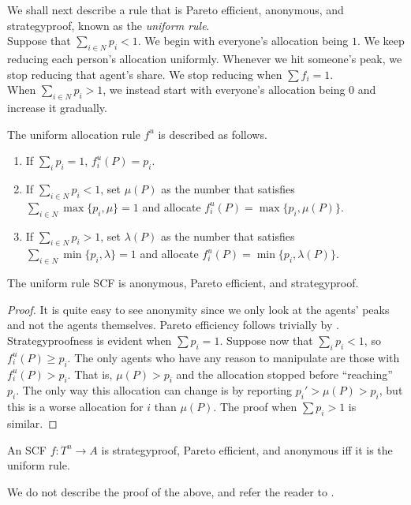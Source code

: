 		We shall next describe a rule that is Pareto efficient, anonymous, and strategyproof, known as the \emph{uniform rule}.\\
		Suppose that $\sum_{i \in N} p_i < 1$. We begin with everyone's allocation being $1$. We keep reducing each person's allocation uniformly. Whenever we hit someone's peak, we stop reducing that agent's share. We stop reducing when $\sum f_i = 1$.\\
		When $\sum_{i \in N} p_i > 1$, we instead start with everyone's allocation being $0$ and increase it gradually.

		\begin{fdef}
			The uniform allocation rule $f^u$ is described as follows.
			\begin{enumerate}
				\item If $\sum_i p_i = 1$, $f_i^u(P) = p_i$.
				\item If $\sum_{i \in N} p_i < 1$, set $\mu(P)$ as the number that satisfies $\sum_{i \in N} \max\{p_i,\mu\} = 1$ and allocate $f_i^u(P) = \max\{p_i,\mu(P)\}$.
				\item If $\sum_{i \in N} p_i > 1$, set $\lambda(P)$ as the number that satisfies $\sum_{i \in N} \min\{p_i,\lambda\} = 1$ and allocate $f_i^u(P) = \min\{p_i,\lambda(P)\}$.
			\end{enumerate}
		\end{fdef}

		\begin{flem}
			The uniform rule SCF is anonymous, Pareto efficient, and strategyproof.
		\end{flem}
		\begin{proof}
			It is quite easy to see anonymity since we only look at the agents' peaks and not the agents themselves.
			Pareto efficiency follows trivially by .\\
			Strategyproofness is evident when $\sum p_i = 1$.
			Suppose now that $\sum_i p_i < 1$, so $f_i^u(P) \ge p_i$. The only agents who have any reason to manipulate are those with $f_i^u(P) > p_i$. That is, $\mu(P) > p_i$ and the allocation stopped before ``reaching'' $p_i$. The only way this allocation can change is by reporting $p_i' > \mu(P) > p_i$, but this is a worse allocation for $i$ than $\mu(P)$. The proof when $\sum p_i > 1$ is similar.
		\end{proof}

		\begin{ftheo}[Sprumont]
			An SCF $f : T^n \to A$ is strategyproof, Pareto efficient, and anonymous iff it is the uniform rule.
		\end{ftheo}
		We do not describe the proof of the above, and refer the reader to \cite{sprumont-uniform-rule}.


